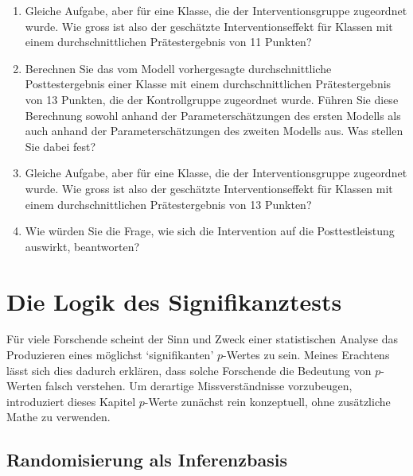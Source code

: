 \documentclass[oneside, 10pt]{book}\usepackage[]{graphicx}\usepackage[]{xcolor}
\begin{document}
\begin{enumerate}
\begin{enumerate}
  \item Gleiche Aufgabe, aber für eine Klasse, die der Interventionsgruppe
  zugeordnet wurde. Wie gross ist also der geschätzte Interventionseffekt
  für Klassen mit einem durchschnittlichen Prätestergebnis von 11 Punkten?

  \item Berechnen Sie das vom Modell vorhergesagte durchschnittliche
  Posttestergebnis einer Klasse mit einem durchschnittlichen Prätestergebnis
  von 13 Punkten, die der Kontrollgruppe zugeordnet wurde.
  Führen Sie diese Berechnung sowohl
  anhand der Parameterschätzungen des ersten Modells
  als auch anhand der Parameterschätzungen des zweiten Modells aus.
  Was stellen Sie dabei fest?

  \item Gleiche Aufgabe, aber für eine Klasse, die der Interventionsgruppe
  zugeordnet wurde. Wie gross ist also der geschätzte Interventionseffekt
  für Klassen mit einem durchschnittlichen Prätestergebnis von 13 Punkten?

  \item Wie würden Sie die Frage, wie sich die Intervention
  auf die Posttestleistung auswirkt, beantworten?

\end{enumerate}
\end{enumerate}


\chapter{Die Logik des Signifikanztests}\label{ch:logik}
Für viele Forschende scheint der Sinn und Zweck
einer statistischen Analyse das Produzieren
eines möglichst `signifikanten' $p$-Wertes zu sein.
Meines Erachtens lässt sich dies dadurch erklären,
dass solche Forschende die Bedeutung von $p$-Werten
falsch verstehen. Um derartige Missverständnisse
vorzubeugen, introduziert dieses Kapitel $p$-Werte
zunächst rein konzeptuell, ohne zusätzliche Mathe
zu verwenden.

\section{Randomisierung als Inferenzbasis}
\end{document}
